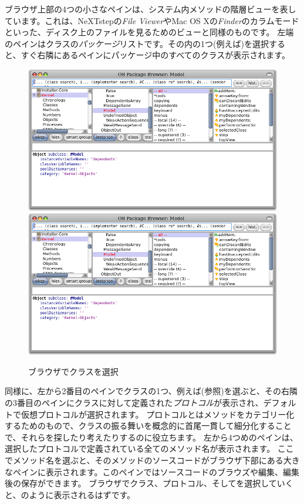 \documentclass[a4paper,10pt,twoside]{book}
\begin{document}
ブラウザ上部の4つの小さなペインは、システム内メソッドの階層ビューを表しています。これは、NeXTstepの\textit{File Viewer}やMac OS Xの\textit{Finder}のカラムモードといった、ディスク上のファイルを見るためのビューと同様のものです。
左端のペインはクラスの\emph{パッケージ}リストです。その内の1つ(例えば)を選択すると、すぐ右隣にあるペインにパッケージ中のすべてのクラスが表示されます。

\begin{figure}[htbp]
   \centering
   \ifluluelse
{\includegraphics[width=\textwidth]{SystemBrowser1} }
{\includegraphics[width=.7\textwidth]{SystemBrowser1} }
   \caption{ブラウザでクラスを選択
   }
\end{figure}

同様に、左から2番目のペインでクラスの1つ、例えば(参照)を選ぶと、その右隣の3番目のペインにクラスに対して定義された\emph{プロトコル}が表示され、デフォルトで仮想プロトコルが選択されます。
プロトコルとはメソッドをカテゴリー化するためのもので、クラスの振る舞いを概念的に首尾一貫して細分化することで、それらを探したり考えたりするのに役立ちます。
左から4つめのペインは、選択したプロトコルで定義されている全てのメソッド名が表示されます。
ここでメソッド名を選ぶと、そのメソッドのソースコードがブラウザ下部にある大きなペインに表示されます。このペインではソースコードのブラウズや編集、編集後の保存ができます。
ブラウザでクラス、プロトコル、そしてを選択していくと、のように表示されるはずです。
\end{document}
